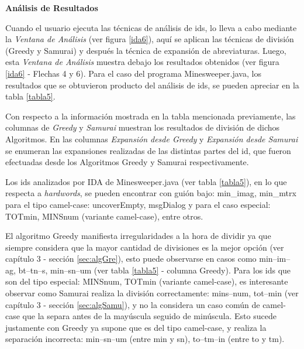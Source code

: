 \clearpage

\noindent \textbf{Análisis de Resultados\\}

Cuando el usuario ejecuta las técnicas de análisis de ids, lo lleva a cabo mediante la \textit{Ventana de Análisis} (ver figura \ref{ida6}), aquí se aplican las técnicas de división (Greedy y Samurai) y después la técnica de expansión de abreviaturas.
Luego, esta \textit{Ventana de Análisis} muestra debajo los resultados obtenidos (ver figura \ref{ida6} - Flechas 4 y 6). Para el caso del programa Minesweeper.java, los resultados que se obtuvieron producto del análisis de ids, se pueden apreciar en la tabla \ref{tabla5}.

Con respecto a la información mostrada en la tabla mencionada previamente, las columnas de \textit{Greedy} y \textit{Samurai} muestran los resultados de división de dichos Algoritmos. En las columnas \textit{Expansión desde Greedy} y \textit{Expansión desde Samurai} se enumeran las expansiones realizadas de las distintas partes del id, que fueron efectuadas desde los Algoritmos Greedy y Samurai respectivamente.

Los ids analizados por IDA de Minesweeper.java (ver tabla \ref{tabla5}), en lo que respecta a \textit{hardwords}, se pueden encontrar con guión bajo: \textsf{min\_imag}, \textsf{min\_mtrx} para el tipo camel-case:  \textsf{uncoverEmpty}, \mbox{\textsf{msgDialog}} y para el caso especial: \textsf{TOTmin}, \textsf{MINSnum} (variante camel-case), entre otros. 

El algoritmo Greedy manifiesta irregularidades a la hora de dividir ya que siempre considera que la mayor cantidad de divisiones es la mejor opción (ver capítulo 3 - sección \ref{sec:algGre}), esto puede observarse en casos como \textsf{min--im--ag},  \textsf{bt--tn--s}, \textsf{min--sn--um} (ver tabla \ref{tabla5} - columna Greedy).
Para los ids que son del tipo especial: \textsf{MINSnum}, \textsf{TOTmin} (variante camel-case), es interesante observar como Samurai realiza la división correctamente: \textsf{mins--num}, \textsf{tot--min} (ver capítulo 3 - sección \ref{sec:algSamu}), y no la considera un caso común de camel-case que la separa antes de la mayúscula seguido de minúscula. Esto sucede justamente con Greedy ya supone que es del tipo camel-case, y realiza la separación incorrecta: \mbox{\textsf{min--sn--um}} (entre min y sn), \textsf{to--tm--in} (entre to y tm).

